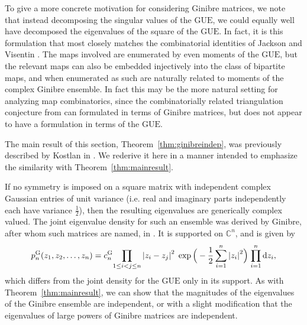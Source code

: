 \documentclass[pdftex, oneside, 10pt, letterpaper]{amsart}
\theoremstyle{plain}
\theoremstyle{definition}
\theoremstyle{remark}
\begin{document}
To give a more concrete motivation for considering Ginibre matrices,
we note that instead decomposing the singular values of the {\ensuremath{\mathrm{GUE}}}{}, we
could equally well have decomposed the eigenvalues of the square of
the {\ensuremath{\mathrm{GUE}}}{}.  In fact, it is this formulation that most closely matches
the combinatorial identities of Jackson and Visentin \cite{JPV,
  JV-Characters, JV-Eulerian}.  The maps involved are enumerated by
even moments of the {\ensuremath{\mathrm{GUE}}}{}, but the relevant maps can also be embedded
injectively into the class of bipartite maps, and when enumerated as
such are naturally related to moments of the complex Ginibre ensemble.
In fact this may be the more natural setting for analyzing map
combinatorics, since the combinatorially related triangulation
conjecture from \cite{JV-Regular, JV-face-colored} can formulated in
terms of Ginibre matrices, but does not appear to have a formulation
in terms of the {\ensuremath{\mathrm{GUE}}}{}.

The main result of this section, Theorem~\ref{thm:ginibreindep}, was
previously described by Kostlan in \cite{Kostlan}.  We rederive it
here in a manner intended to emphasize the similarity with
Theorem~\ref{thm:mainresult}.

If no symmetry is imposed on a square matrix with independent complex
Gaussian entries of unit variance (i.e. real and imaginary parts
independently each have variance $\frac12$), then the resulting
eigenvalues are generically complex valued.  The joint eigenvalue
density for such an ensemble was derived by Ginibre, after whom such
matrices are named, in \cite{Ginibre}.  It is supported on
$\mathbb{C}^n$, and is given by
\begin{equation}\label{eqn:ginibredensity}
  p^{\mathrm{G}}_n(z_1,z_2,\dotsc,z_n)=c^{\mathrm{G}}_n {\prod_{1\leq
      i<j\leq{}n}{{\ifx\relax{}\relax\else\fi}{{}}\lvert{z_i-z_j}{{}}\rvert}^2} \;\exp\Big(-\frac12\sum_{i=1}^n
  {{\ifx\relax{}\relax\else\fi}{{}}\lvert{z_i}{{}}\rvert}^2\Big) {\;\prod_{i={1}}^{{n}} \mathrm{d}{{z}}_i},
\end{equation}
which differs from the joint density for the {\ensuremath{\mathrm{GUE}}}{} only in its support.
As with Theorem~\ref{thm:mainresult}, we can show that the magnitudes
of the eigenvalues of the Ginibre ensemble are independent, or with a
slight modification that the eigenvalues of large powers of Ginibre
matrices are independent.
\end{document}
